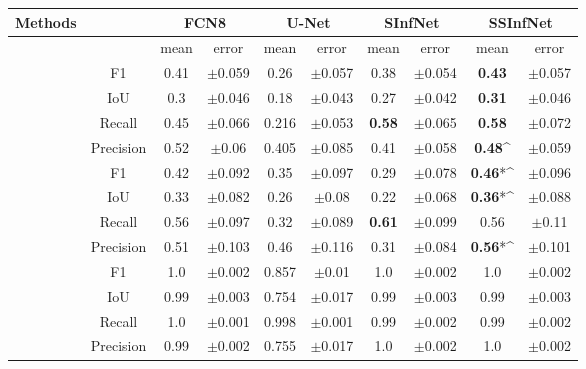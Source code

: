 \begin{table}[!h]
	\centering
	\begin{tabular}{ |c|c|c|c|c|c|c|c|c|c| }
		\hline
		Methods & & \multicolumn{2}{c|}{FCN8} & \multicolumn{2}{c|}{U-Net} & \multicolumn{2}{c|}{SInfNet} & \multicolumn{2}{c|}{SSInfNet}  \\ \hline
		&  &mean & error & mean & error & mean & error & mean & error \\ \hline
		
		\multirow{4}{*}{\rotatebox[origin=c]{90}{GGO}} 
		& F1 & 0.41 & $\pm$0.059 & 0.26 & $\pm$0.057 & 0.38 &$\pm$0.054 & \textbf{0.43} & $\pm$0.057 \\ \cline{2-10}
		& IoU & 0.3 & $\pm$0.046 & 0.18 &$\pm$0.043 &0.27 &$\pm$0.042 &
		\textbf{0.31} &$\pm$0.046 \\ \cline{2-10}
		& Recall & 0.45 & $\pm$0.066 & 0.216 &$\pm$0.053 &\textbf{0.58} &$\pm$0.065 &\textbf{0.58} &$\pm$0.072 \\ \cline{2-10}
		& Precision & 0.52 & $\pm$0.06 & 0.405 &$\pm$0.085 &0.41 &$\pm$0.058 &
		\textbf{0.48}\^ &$\pm$0.059 \\ \cline{2-10}
		\hline \hline
		
		\multirow{4}{*}{\rotatebox[origin=c]{90}{Cons}} 
		& F1 & 0.42 & $\pm$0.092 & 0.35 &$\pm$0.097 &0.29 &$\pm$0.078 &\textbf{0.46}*\^ &$\pm$0.096 \\ \cline{2-10}
		& IoU & 0.33 & $\pm$0.082 & 0.26& $\pm$0.08&0.22 &$\pm$0.068 &\textbf{0.36}*\^ &$\pm$0.088 \\ \cline{2-10}
		& Recall & 0.56 & $\pm$0.097 & 0.32 &$\pm$0.089 &\textbf{0.61} &$\pm$0.099 &0.56 &$\pm$0.11 \\ \cline{2-10}
		& Precision & 0.51 & $\pm$0.103 & 0.46 &$\pm$0.116 &0.31 &$\pm$0.084 &\textbf{0.56}*\^ &$\pm$0.101 \\ \cline{2-10}
		\hline \hline
		
		\multirow{4}{*}{\rotatebox[origin=c]{90}{Background}} 
		& F1 & 1.0 & $\pm$0.002 & 0.857&$\pm$0.01 &1.0 &$\pm$0.002 &1.0 &$\pm$0.002 \\ \cline{2-10}
		& IoU & 0.99 & $\pm$0.003 & 0.754&$\pm$0.017 &0.99 &$\pm$0.003 &0.99 &$\pm$0.003 \\ \cline{2-10}
		& Recall & 1.0 & $\pm$0.001 & 0.998 &$\pm$0.001 &0.99 &$\pm$0.002 &0.99 &$\pm$0.002 \\ \cline{2-10}
		& Precision & 0.99 & $\pm$0.002 & 0.755 &$\pm$0.017 &1.0 &$\pm$0.002 &1.0 &$\pm$0.002 \\ \cline{2-10}
		\hline \hline
		

\end{tabular}
\end{table}
